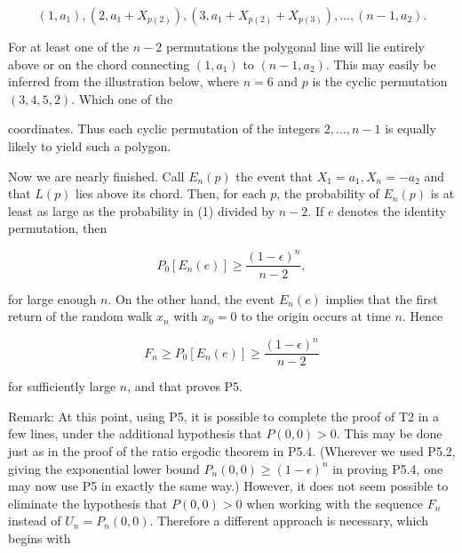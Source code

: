 $$(1, a_1), (2, a_1 + X_{p(2)}), (3, a_1 + X_{p(2)} + X_{p(3)}), \ldots, (n - 1, a_2).$$

For at least one of the $n - 2$ permutations the polygonal line will lie entirely above or on the chord connecting $(1, a_1)$ to $(n - 1, a_2)$. This may easily be inferred from the illustration below, where $n = 6$ and $p$ is the cyclic permutation $(3, 4, 5, 2)$. Which one of the

coordinates. Thus each cyclic permutation of the integers $2, \ldots, n-1$ is equally likely to yield such a polygon.

Now we are nearly finished. Call $E_n(p)$ the event that $X_1 = a_1, X_n = -a_2$ and that $L(p)$ lies above its chord. Then, for each $p$, the probability of $E_n(p)$ is at least as large as the probability in (1) divided by $n-2$. If $e$ denotes the identity permutation, then

$$P_0[E_n(e)] \geq \frac{(1-\epsilon)^n}{n-2},$$

for large enough $n$. On the other hand, the event $E_n(e)$ implies that the first return of the random walk $x_n$ with $x_0 = 0$ to the origin occurs at time $n$. Hence

$$F_n \geq P_0[E_n(e)] \geq \frac{(1-\epsilon)^n}{n-2}$$

for sufficiently large $n$, and that proves P5.

Remark: At this point, using P5, it is possible to complete the proof of T2 in a few lines, under the additional hypothesis that $P(0,0) > 0$. This may be done just as in the proof of the ratio ergodic theorem in P5.4. (Wherever we used P5.2, giving the exponential lower bound $P_n(0,0) \geq (1-\epsilon)^n$ in proving P5.4, one may now use P5 in exactly the same way.) However, it does not seem possible to eliminate the hypothesis that $P(0,0) > 0$ when working with the sequence $F_n$ instead of $U_n = P_n(0,0)$. Therefore a different approach is necessary, which begins with